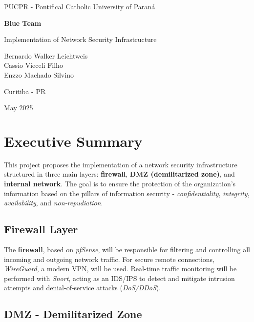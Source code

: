 \documentclass[12pt]{report}
\newcommand{\institution}{PUCPR - Pontifical Catholic University of Paraná}
\newcommand{\authorname}{Bernardo Walker Leichtweis \\ Cassio Vieceli Filho \\ Enzzo Machado Silvino}
\newcommand{\location}{Curitiba - PR}
\newcommand{\dateinfo}{May 2025}
\newcommand{\titleinfo}{Blue Team}
\newcommand{\subtitleinfo}{Implementation of Network Security Infrastructure}
\begin{document}
\begin{titlepage}
    \centering
    {\large \institution \par}
    \vspace{2cm}
    {\LARGE \textbf{\titleinfo} \par}
    \vspace{0.5cm}
    {\Large \subtitleinfo \par}
    \vspace{3cm}
    {\large \authorname \par}
    \vfill
    {\large \location \par}
    {\large \dateinfo \par}
\end{titlepage}

\tableofcontents
\newpage

\section*{Executive Summary}

This project proposes the implementation of a network security infrastructure structured in three main layers: \textbf{firewall}, \textbf{DMZ (demilitarized zone)}, and \textbf{internal network}. The goal is to ensure the protection of the organization's information based on the pillars of information security - \textit{confidentiality}, \textit{integrity}, \textit{availability}, and \textit{non-repudiation}.

\subsection*{Firewall Layer}

The \textbf{firewall}, based on \textit{pfSense}, will be responsible for filtering and controlling all incoming and outgoing network traffic. For secure remote connections, \textit{WireGuard}, a modern VPN, will be used. Real-time traffic monitoring will be performed with \textit{Snort}, acting as an IDS/IPS to detect and mitigate intrusion attempts and denial-of-service attacks (\textit{DoS/DDoS}).

\subsection*{DMZ - Demilitarized Zone}
\end{document}
